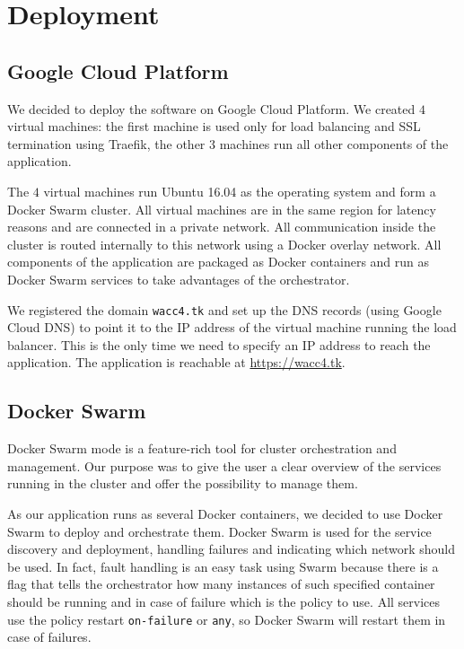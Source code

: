 \section{Deployment}
\label{sec:deployment}

\subsection{Google Cloud Platform}
We decided to deploy the software on Google Cloud Platform.
We created $4$ virtual machines: the first machine is used only for load balancing and SSL termination using Traefik, the other $3$ machines run all other components of the application.

The $4$ virtual machines run Ubuntu 16.04 as the operating system and form a Docker Swarm cluster.
All virtual machines are in the same region for latency reasons and are connected in a private network. All communication inside the cluster is routed internally to this network using a Docker overlay network.
All components of the application are packaged as Docker containers and run as Docker Swarm services to take advantages of the orchestrator.

We registered the domain \texttt{wacc4.tk} and set up the DNS records (using Google Cloud DNS) to point it to the IP address of the virtual machine running the load balancer.
This is the only time we need to specify an IP address to reach the application.
The application is reachable at \url{https://wacc4.tk}.


\subsection{Docker Swarm}
Docker Swarm mode is a feature-rich tool for cluster orchestration and management.
Our purpose was to give the user a clear overview of the services running in the cluster and offer the possibility to manage them.

As our application runs as several Docker containers, we decided to use Docker Swarm to deploy and orchestrate them.
Docker Swarm is used for the service discovery and deployment, handling failures and indicating which network should be used.
In fact, fault handling is an easy task using Swarm because there is a flag that tells the orchestrator how many instances of such specified container should be running and in case of failure which is the policy to use.
All services use the policy restart \texttt{on-failure} or \texttt{any}, so Docker Swarm will restart them in case of failures.

